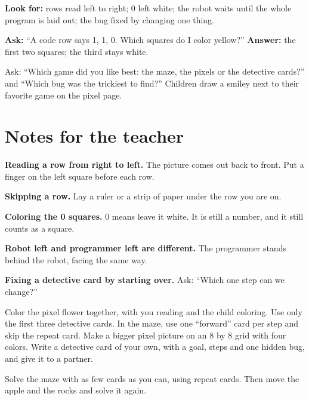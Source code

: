 \begin{formativecheck}
\textbf{Look for:} rows read left to right; 0 left white; the robot waits until the whole program is laid out; the bug fixed by changing one thing.

\textbf{Ask:} \enquote{A code row says 1, 1, 0. Which squares do I color yellow?}
\textbf{Answer:} the first two squares; the third stays white.
\end{formativecheck}

\begin{reflection}
Ask: \enquote{Which game did you like best: the maze, the pixels or the detective cards?} and \enquote{Which bug was the trickiest to find?} Children draw a smiley next to their favorite game on the pixel page.
\end{reflection}

\section{Notes for the teacher}
\begin{commonmistakes}
  \item \textbf{Reading a row from right to left.} The picture comes out back to front. Put a finger on the left square before each row.
  \item \textbf{Skipping a row.} Lay a ruler or a strip of paper under the row you are on.
  \item \textbf{Coloring the 0 squares.} 0 means leave it white. It is still a number, and it still counts as a square.
  \item \textbf{Robot left and programmer left are different.} The programmer stands behind the robot, facing the same way.
  \item \textbf{Fixing a detective card by starting over.} Ask: \enquote{Which one step can we change?}
\end{commonmistakes}

\begin{differentiation}
\supportpath Color the pixel flower together, with you reading and the child coloring. Use only the first three detective cards. In the maze, use one \enquote{forward} card per step and skip the repeat card.
\extensionpath Make a bigger pixel picture on an 8 by 8 grid with four colors. Write a detective card of your own, with a goal, steps and one hidden bug, and give it to a partner.
\end{differentiation}

\begin{stretchchallenge}
Solve the maze with as few cards as you can, using repeat cards. Then move the apple and the rocks and solve it again.
\end{stretchchallenge}

